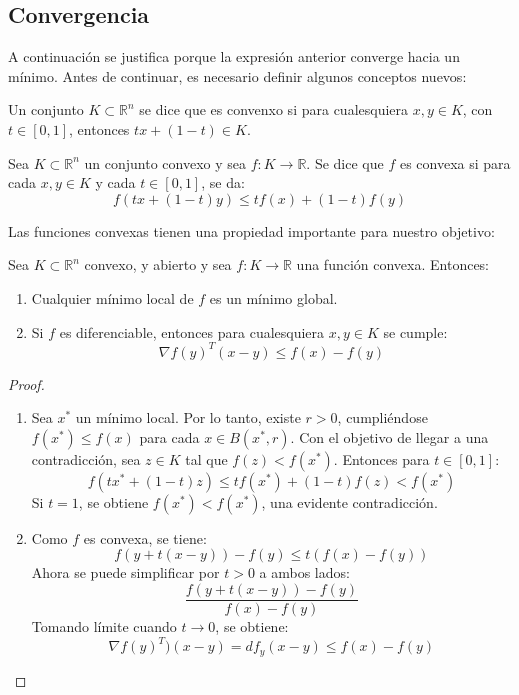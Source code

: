 \subsection*{Convergencia}

A continuación se justifica porque la expresión anterior converge hacia un mínimo. Antes de continuar, es necesario definir algunos
conceptos nuevos:
\begin{definition}
    Un conjunto $K\subset \mathbb{R}^n$ se dice que es convenxo si para cualesquiera $x,y\in K$, con $t\in[0,1]$, entonces $tx+(1-t)\in K$.
\end{definition}

\begin{definition}
    Sea $K\subset \mathbb{R}^n$ un conjunto convexo y sea $f: K \rightarrow \mathbb{R}$. Se dice que $f$ es convexa si para cada $x,y\in K$ y cada $t \in [0,1]$, se da:
    \[
        f(tx+(1-t)y) \leq tf(x)+(1-t)f(y)
    \]
\end{definition}

Las funciones convexas tienen una propiedad importante para nuestro objetivo:

\begin{proposition}\label{prop:convexo}
    Sea $K\subset \mathbb{R}^n$ convexo, y abierto y sea $f: K \rightarrow \mathbb{R}$ una función convexa. Entonces:
    \begin{enumerate}
        \item Cualquier mínimo local de $f$ es un mínimo global.
        \item Si $f$ es diferenciable, entonces para cualesquiera $x,y\in K$ se cumple:
        \begin{equation}\label{random:2}
            \nabla f(y)^T(x-y) \leq f(x) - f(y)
        \end{equation}
    \end{enumerate}
\end{proposition}

\begin{proof}$ $
    \begin{enumerate}
        \item Sea $x^*$ un mínimo local. Por lo tanto, existe $r>0$, cumpliéndose $f(x^*)\leq f(x)$ para cada $x\in B(x^*, r)$. Con el objetivo
        de llegar a una contradicción, sea $z\in K$ tal que $f(z) < f(x^*)$. Entonces para $t\in[0,1]$:
        \[
            f(tx^* + (1-t)z) \leq tf(x^*)+(1-t)f(z) < f(x^*)
        \]
        Si $t=1$, se obtiene $f(x^*) < f(x^*)$, una evidente contradicción.
        \item Como $f$ es convexa, se tiene:
        \[
            f(y+t(x-y))-f(y) \leq t(f(x)-f(y))
        \]
        Ahora se puede simplificar por $t>0$ a ambos lados:
        \[
            \frac{f(y+t(x-y))-f(y)}{f(x)-f(y)}
        \]
        Tomando límite cuando $t \longrightarrow 0$, se obtiene:
        \[
            \nabla f(y)^T)(x-y)=df_y(x-y) \leq f(x)-f(y)
        \]
    \end{enumerate}
\end{proof}

